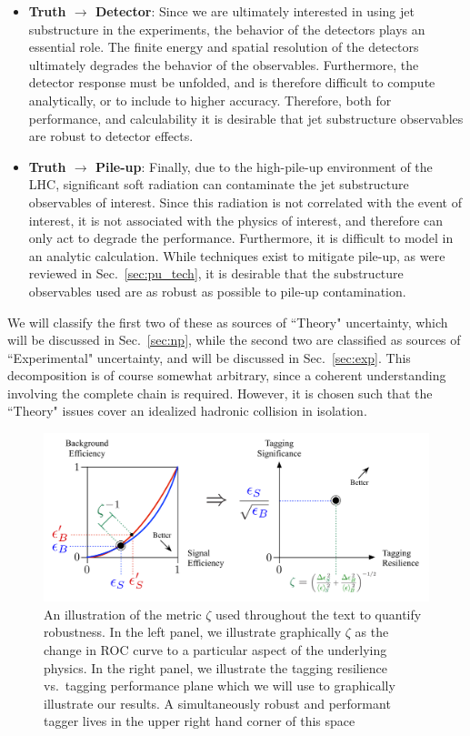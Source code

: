 \documentclass[11pt,letterpaper]{article}
\DeclareRobustCommand{\Sec}[1]{Sec.~\ref{#1}}
\begin{document}
\begin{itemize}
%
\item {\bf Truth $\to$ Detector}: Since we are ultimately interested in using jet substructure in the experiments, the behavior of the detectors plays an essential role.
%
The finite energy and spatial resolution of the detectors ultimately degrades the behavior of the observables.
%
Furthermore, the detector response must be unfolded, and is therefore difficult to compute analytically, or to include to higher accuracy. Therefore, both for performance, and calculability it is desirable that jet substructure observables are robust to detector effects.
%
\item {\bf Truth $\to$ Pile-up}: Finally, due to the high-pile-up environment of the LHC, significant soft radiation can contaminate the jet substructure observables of interest.
%
Since this radiation is not correlated with the event of interest, it is not associated with the physics of interest, and therefore can only act to degrade the performance.
%
Furthermore, it is difficult to model in an analytic calculation.
%
While techniques exist to mitigate pile-up, as were reviewed in \Sec{sec:pu_tech}, it is desirable that the substructure observables used are as robust as possible to pile-up contamination.
%
\end{itemize}
%
We will classify the first two of these as sources of ``Theory" uncertainty, which will be discussed in \Sec{sec:np}, while the second two are classified as sources of ``Experimental" uncertainty, and will be discussed in \Sec{sec:exp}. This decomposition is of course somewhat arbitrary, since a coherent understanding involving the complete chain is required. However, it is chosen such that the ``Theory" issues cover an idealized hadronic collision in isolation. 

\begin{figure}[t]
\begin{center}
\includegraphics[width=1.0\columnwidth]{figures/roc_to_significance}
\end{center}
\caption{An illustration of the metric $\zeta$ used throughout the text to quantify robustness. In the left panel, we illustrate graphically $\zeta$ as the change in ROC curve to a particular aspect of the underlying physics. In the right panel, we illustrate the tagging resilience vs.\ tagging performance plane which we will use to graphically illustrate our results.  A simultaneously robust and performant tagger lives in the upper right hand corner of this space}
\label{fig:zeta_def}
\end{figure}
\end{document}
